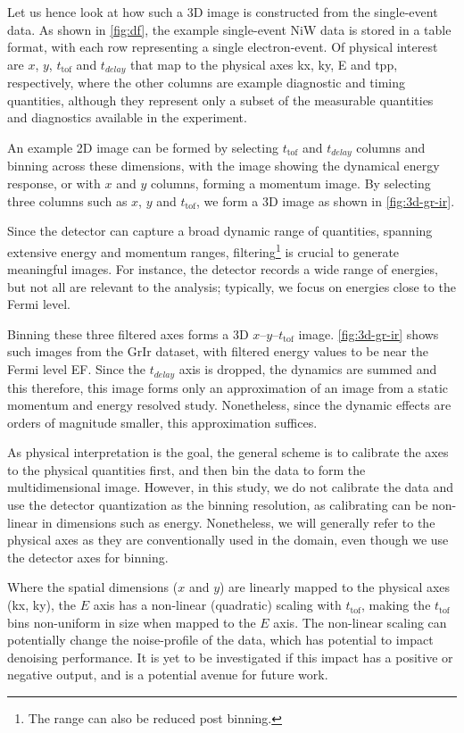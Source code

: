 Let us hence look at how such a 3D image is constructed from the single-event data. As shown in \cref{fig:df}, the example single-event \gls{NiW} data is stored in a table format, with each row representing a single electron-event. Of physical interest are $x$, $y$, $t_{\text{tof}}$ and $t_{delay}$ that map to the physical axes \gls{kx}, \gls{ky}, \gls{E} and \gls{tpp}, respectively, where the other columns are example diagnostic and timing quantities, although they represent only a subset of the measurable quantities and diagnostics available in the experiment.

An example 2D image can be formed by selecting $t_{\text{tof}}$ and $t_{delay}$ columns and binning across these dimensions, with the image showing the dynamical energy response, or with $x$ and $y$ columns, forming a momentum image. By selecting three columns such as $x$, $y$ and $t_{\text{tof}}$, we form a 3D image as shown in \cref{fig:3d-gr-ir}.

Since the detector can capture a broad dynamic range of quantities, spanning extensive energy and momentum ranges, filtering\footnote{The range can also be reduced post binning.} is crucial to generate meaningful images. For instance, the detector records a wide range of energies, but not all are relevant to the analysis; typically, we focus on energies close to the Fermi level. 

Binning these three filtered axes forms a 3D $x$--$y$--$t_{\text{tof}}$ image. \cref{fig:3d-gr-ir} shows such images from the \gls{GrIr} dataset, with filtered energy values to be near the Fermi level \gls{EF}. Since the $t_{delay}$ axis is dropped, the dynamics are summed and this therefore, this image forms only an approximation of an image from a static momentum and energy resolved study. Nonetheless, since the dynamic effects are orders of magnitude smaller, this approximation suffices.

As physical interpretation is the goal, the general scheme is to calibrate the axes to the physical quantities first, and then bin the data to form the multidimensional image. However, in this study, we do not calibrate the data and use the detector quantization as the binning resolution, as calibrating can be non-linear in dimensions such as energy. Nonetheless, we will generally refer to the physical axes as they are conventionally used in the domain, even though we use the detector axes for binning.

Where the spatial dimensions ($x$ and $y$) are linearly mapped to the physical axes (\gls{kx}, \gls{ky}), the $E$ axis has a non-linear (quadratic) scaling with $t_{\text{tof}}$, making the $t_{\text{tof}}$ bins non-uniform in size when mapped to the $E$ axis. The non-linear scaling can potentially change the noise-profile of the data, which has potential to impact denoising performance. It is yet to be investigated if this impact has a positive or negative output, and is a potential avenue for future work.

